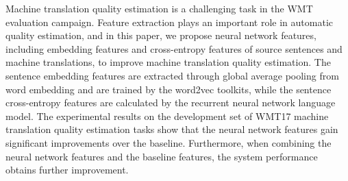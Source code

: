 Machine translation quality estimation is a challenging task in the WMT evaluation campaign. Feature extraction plays an important role in automatic quality estimation, and in this paper, we propose neural network features, including embedding features and cross-entropy features of source sentences and machine translations, to improve machine translation quality estimation. The sentence embedding features are extracted through global average pooling from word embedding and are trained by the word2vec toolkits, while the sentence cross-entropy features are calculated by the recurrent neural network language model. The experimental results on the development set of WMT17 machine translation quality estimation tasks show that the neural network features gain significant improvements over the baseline. Furthermore, when combining the neural network features and the baseline features, the system performance obtains further improvement.
